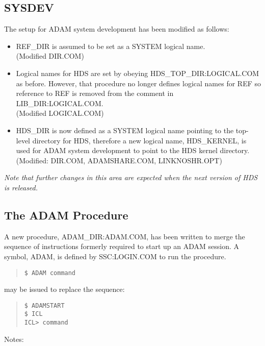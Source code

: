 \subsection{SYSDEV}
The setup for ADAM system development has been modified as follows:
\begin{itemize}
\item REF\_DIR is assumed to be set as a SYSTEM logical name.\\
(Modified DIR.COM)
\item Logical names for HDS are set by obeying HDS\_TOP\_DIR:LOGICAL.COM as
before. However, that procedure no longer defines logical names for REF so
reference to REF is removed from the comment in LIB\_DIR:LOGICAL.COM.\\
(Modified LOGICAL.COM)
\item HDS\_DIR is now defined as a SYSTEM logical name pointing to the
top-level directory for HDS, therefore a new logical name, HDS\_KERNEL, is used
for ADAM system development to point to the HDS kernel directory.\\
(Modified: DIR.COM, ADAMSHARE.COM, LINKNOSHR.OPT)
\end{itemize}
{\em Note that further changes in this area are expected when the next version
of HDS is released.}

\subsection{The ADAM Procedure}
A new procedure, ADAM\_DIR:ADAM.COM, has been written to merge the sequence
of instructions formerly required to start up an ADAM session.
A symbol, ADAM, is defined by SSC:LOGIN.COM to run the procedure.
\begin{quote} \begin{verbatim}
$ ADAM command
\end{verbatim} \end{quote}
may be issued to replace the sequence:
\begin{quote} \begin{verbatim}
$ ADAMSTART
$ ICL
ICL> command
\end{verbatim} \end{quote}

Notes:

